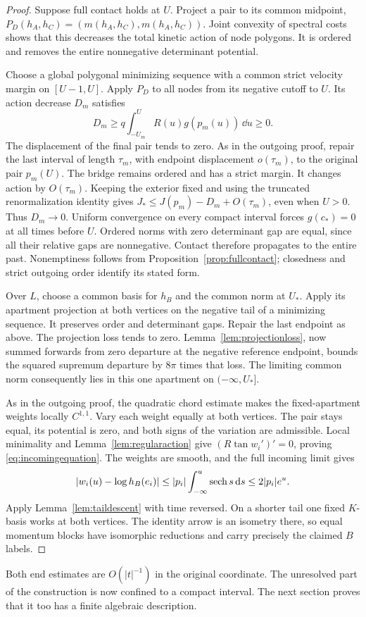 \begin{proof}
Suppose full contact holds at $U$. Project a pair to its common
midpoint, $P_D(h_A,h_C)=(m(h_A,h_C),m(h_A,h_C))$.
Joint convexity of spectral costs shows that this decreases the
total kinetic action of node polygons. It is ordered and removes
the entire nonnegative determinant potential.

Choose a global polygonal minimizing sequence with a common
strict velocity margin on $[U-1,U]$. Apply $P_D$ to all nodes
from its negative cutoff to $U$. Its action decrease $D_m$
satisfies
\[
 D_m\ge q\int_{-U_m}^U R(u)g(p_m(u))\,\dd u\ge0.
\]
The displacement of the final pair tends to zero. As in the
outgoing proof, repair the last interval of length $\tau_m$,
with endpoint displacement $o(\tau_m)$, to the original pair
$p_m(U)$. The bridge remains ordered and has a strict margin.
It changes action by $O(\tau_m)$. Keeping the exterior fixed
and using the truncated renormalization identity gives
$J_*\le J(p_m)-D_m+O(\tau_m)$, even when $U>0$.
Thus $D_m\to0$. Uniform convergence on every compact interval
forces $g(c_*)=0$ at all times before $U$. Ordered norms with
zero determinant gap are equal, since all their relative gaps
are nonnegative. Contact therefore propagates to the entire past.
Nonemptiness follows from Proposition~\ref{prop:fullcontact};
closedness and strict outgoing order identify its stated form.

Over $L$, choose a common basis for $h_B$ and the common norm
at $U_*$. Apply its apartment projection at both vertices on
the negative tail of a minimizing sequence. It preserves order
and determinant gaps. Repair the last endpoint as above.
The projection loss tends to zero. Lemma~\ref{lem:projectionloss},
now summed forwards from zero departure at the negative reference
endpoint, bounds the squared supremum departure by $8\pi$ times
that loss. The limiting common norm consequently lies in this
one apartment on $(-\infty,U_*]$.

As in the outgoing proof, the quadratic chord estimate makes
the fixed-apartment weights locally $C^{1,1}$. Vary each weight
equally at both vertices. The pair
stays equal, its potential is zero, and both signs of the variation
are admissible. Local minimality and
Lemma~\ref{lem:regularaction} give
$(R\tan w_i')'=0$, proving \eqref{eq:incomingequation}.
The weights are smooth, and the full incoming limit gives
\[
 |w_i(u)-\log h_B(e_i)|
 \le |p_i|\int_{-\infty}^u\operatorname{sech} s\,\mathrm d s
 \le2|p_i|e^u.
\]
Apply Lemma~\ref{lem:taildescent} with time reversed. On a shorter
tail one fixed $K$-basis works at both vertices. The identity
arrow is an isometry there, so equal momentum blocks have
isomorphic reductions and carry precisely the claimed $B$ labels.
\end{proof}

Both end estimates are $O(|t|^{-1})$ in the original coordinate.
The unresolved part of the construction is now confined to a
compact interval. The next section proves that it too has a finite
algebraic description.
